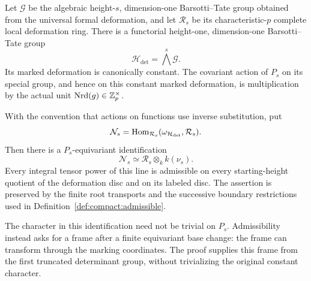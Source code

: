 \begin{lemma}
\label{lem:compact:norm-line}
Let $\mathcal G$ be the algebraic height-$s$, dimension-one
Barsotti--Tate group obtained from the universal formal deformation,
and let $\mathcal R_s$ be its characteristic-$p$ complete local
deformation ring.  There is a functorial height-one, dimension-one
Barsotti--Tate group
\[
                 \mathcal H_{\det}=\bigwedge^s\mathcal G.
\]
Its marked deformation is canonically constant.  The covariant action
of $P_s$ on its special group, and hence on this constant marked
deformation, is multiplication by the actual unit
$\operatorname{Nrd}(g)\in\mathbb Z_p^\times$.

With the convention that actions on functions use inverse
substitution, put
\[
 \mathcal N_s=
       \operatorname{Hom}_{\mathcal R_s}(\omega_{\mathcal H_{\det}},\mathcal R_s).
\]
Then there is a $P_s$-equivariant identification
\[
             \mathcal N_s\simeq
                 \mathcal R_s\otimes_k k(\nu_s).
\]
Every integral tensor power of this line is admissible on every
starting-height quotient of the deformation disc and on its labeled
disc.  The assertion is preserved by the finite root transports and
the successive boundary restrictions used in
Definition~\ref{def:compact:admissible}.
\end{lemma}

The character in this identification need not be trivial on $P_s$.
Admissibility instead asks for a frame after a finite equivariant
base change: the frame can transform through the marking coordinates.
The proof supplies this frame from the first truncated determinant
group, without trivializing the original constant character.

